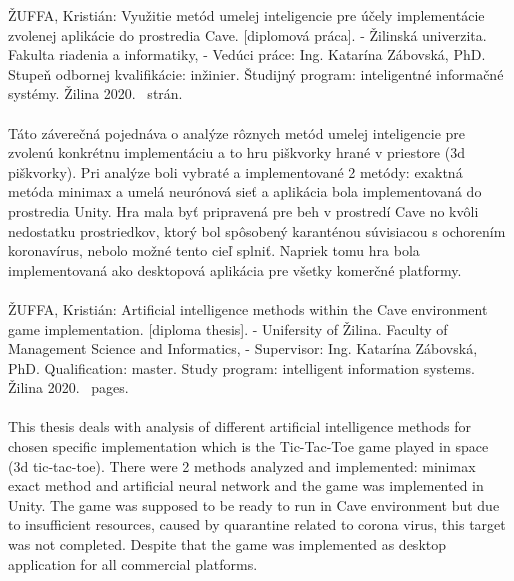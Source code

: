 ŽUFFA, Kristián: Využitie metód umelej inteligencie pre účely implementácie zvolenej aplikácie do prostredia Cave.
[diplomová práca].
- Žilinská univerzita.
Fakulta riadenia a informatiky, -
Vedúci práce: Ing. Katarína Zábovská, PhD.
Stupeň odbornej kvalifikácie: inžinier.
Študijný program: inteligentné informačné systémy.
Žilina 2020.~\pageref{LastPage} strán.
\\
\\
Táto záverečná pojednáva o analýze rôznych metód umelej inteligencie pre zvolenú konkrétnu implementáciu a to hru
piškvorky hrané v priestore (3d piškvorky).
Pri analýze boli vybraté a implementované 2 metódy: exaktná metóda minimax a umelá neurónová sieť a aplikácia bola
implementovaná do prostredia Unity.
Hra mala byť pripravená pre beh v prostredí Cave no kvôli nedostatku prostriedkov, ktorý bol spôsobený karanténou
súvisiacou s ochorením koronavírus, nebolo možné tento cieľ splniť.
Napriek tomu hra bola implementovaná ako desktopová aplikácia pre všetky komerčné platformy.
\\
\\

ŽUFFA, Kristián: Artificial intelligence methods within the Cave environment game implementation.
[diploma thesis].
- Unifersity of Žilina.
Faculty of Management Science and Informatics, -
Supervisor: Ing. Katarína Zábovská, PhD.
Qualification: master.
Study program: intelligent information systems.
Žilina 2020.~\pageref{LastPage} pages.
\\
\\
This thesis deals with analysis of different artificial intelligence methods for chosen specific implementation which
is the Tic-Tac-Toe game played in space (3d tic-tac-toe).
There were 2 methods analyzed and implemented: minimax exact method and artificial neural network and the game was
implemented in Unity.
The game was supposed to be ready to run in Cave environment but due to insufficient resources, caused by quarantine
related to corona virus, this target was not completed.
Despite that the game was implemented as desktop application for all commercial platforms.
\\

